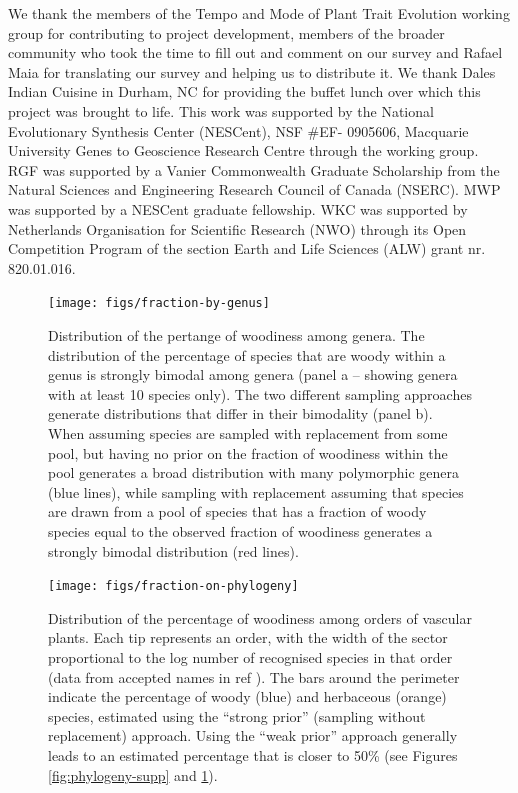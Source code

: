 \documentclass[12pt]{article}
\begin{document}
We thank the members of the Tempo and Mode of Plant Trait
Evolution working group for contributing to project development,
members of the broader community who took the time to fill out and
comment on our survey and Rafael Maia for translating our survey and
helping us to distribute it.
We thank Dales Indian Cuisine in Durham, NC for providing the buffet
lunch over which this project was brought to life.
%
This work was supported by the National Evolutionary Synthesis Center
(NESCent), NSF \#EF- 0905606, Macquarie University Genes to Geoscience
Research Centre through the working group.
%
RGF was supported by a Vanier Commonwealth Graduate Scholarship from
the Natural Sciences and Engineering Research Council of Canada
(NSERC).
MWP was supported by a NESCent graduate fellowship.
%
WKC was supported by Netherlands Organisation for
Scientific Research (NWO) through its Open Competition Program of the
section Earth and Life Sciences (ALW) grant nr. 820.01.016.




\begin{figure}[p]
  \centering
  \texttt{[image: figs/fraction-by-genus]}
  \caption{Distribution of the pertange of woodiness among genera.
    The distribution of the percentage of species that are woody within
    a genus is strongly bimodal among genera (panel a -- showing
    genera with at least 10 species only).
    The two different sampling approaches generate distributions that
    differ in their bimodality (panel b). When assuming species are
    sampled with replacement from some pool, but having no prior on
    the fraction of woodiness within the pool generates a broad
    distribution with many polymorphic genera (blue lines), while
    sampling with replacement assuming that species are drawn from a
    pool of species that has a fraction of woody species equal to the
    observed fraction of woodiness generates a strongly bimodal
    distribution (red lines).}
  \label{fig:distribution-genera}
\end{figure}

\begin{figure}[p]
  \centering
  \texttt{[image: figs/fraction-on-phylogeny]}
  \caption{Distribution of the percentage of woodiness among orders of
    vascular plants.  Each tip represents an order, with the width of
    the sector proportional to the log number of recognised species in
    that order (data from accepted names in ref \citep{ThePlantList}).
    The bars around the perimeter indicate the percentage of woody
    (blue) and herbaceous (orange) species, estimated using the
    ``strong prior'' (sampling without replacement) approach.  Using
    the ``weak prior'' approach generally leads to an estimated
    percentage that is closer to 50\% (see Figures
    \ref{fig:phylogeny-supp} and \ref{fig:distribution-genera}).}
\label{fig:phylogeny}
\end{figure}
\end{document}
